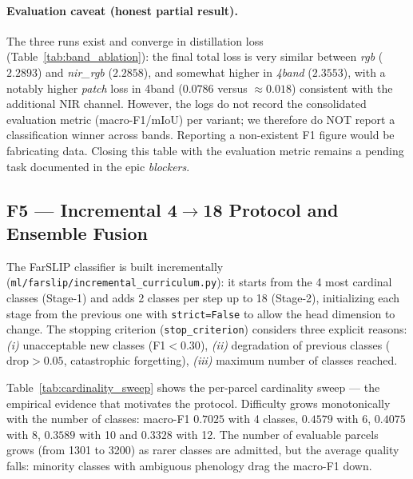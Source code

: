 

\paragraph{Evaluation caveat (honest partial result).}
The three runs exist and converge in distillation loss
(Table~\ref{tab:band_ablation}): the final total loss is very similar between
\textit{rgb} ($2.2893$) and \textit{nir\_rgb} ($2.2858$), and somewhat higher in
\textit{4band} ($2.3553$), with a notably higher \textit{patch} loss in 4band
($0.0786$ versus $\approx0.018$) consistent with the additional NIR channel.
However, the logs do not record the consolidated evaluation metric
(macro-F1/mIoU) per variant; we therefore do NOT report a classification winner
across bands. Reporting a non-existent F1 figure would be fabricating data.
Closing this table with the evaluation metric remains a pending task documented
in the epic \textit{blockers}.

\subsection{F5 --- Incremental 4$\rightarrow$18 Protocol and Ensemble Fusion}
\label{sec:farslip_f5}

The FarSLIP classifier is built incrementally
(\texttt{ml/farslip/incremental\_curriculum.py}): it starts from the 4 most
cardinal classes (Stage-1) and adds 2 classes per step up to 18 (Stage-2),
initializing each stage from the previous one with \texttt{strict=False} to allow
the head dimension to change. The stopping criterion (\texttt{stop\_criterion})
considers three explicit reasons: \textit{(i)} unacceptable new classes
(F1$<0.30$), \textit{(ii)} degradation of previous classes
($\text{drop}>0.05$, catastrophic forgetting), \textit{(iii)} maximum number of
classes reached.

Table~\ref{tab:cardinality_sweep} shows the per-parcel cardinality sweep --- the
empirical evidence that motivates the protocol. Difficulty grows monotonically
with the number of classes: macro-F1 $0.7025$ with 4 classes, $0.4579$ with 6,
$0.4075$ with 8, $0.3589$ with 10 and $0.3328$ with 12. The number of evaluable
parcels grows (from 1301 to 3200) as rarer classes are admitted, but the average
quality falls: minority classes with ambiguous phenology drag the macro-F1 down.



